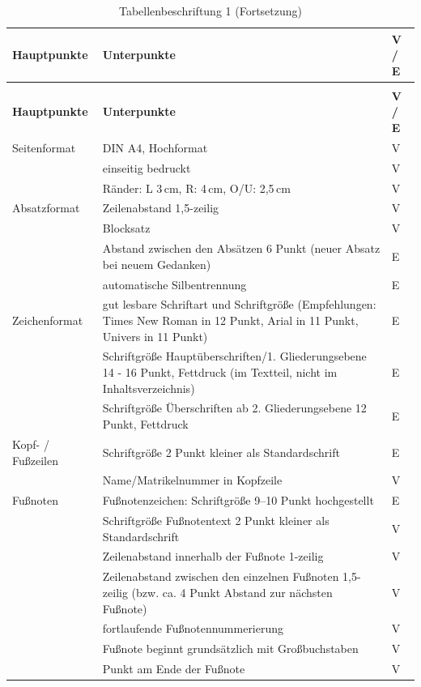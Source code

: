 \begingroup
\footnotesize
{}
\begin{longtable}{@{}p{}p{}
  >{\centering\arraybackslash}p{}@{}}
  \caption{Tabellenbeschriftung 1}
  \label{tab:hfh-format}\\
  \toprule
  \textbf{Hauptpunkte} &
  \textbf{Unterpunkte} &
  \textbf{V / E} \\
  \midrule
  \endfirsthead
  \caption[]{Tabellenbeschriftung 1 (Fortsetzung)}\\
  \toprule
  \textbf{Hauptpunkte} &
  \textbf{Unterpunkte} &
  \textbf{V / E} \\
  \midrule
  \endhead
  \bottomrule
  \endfoot

  Seitenformat &
  DIN A4, Hochformat &
  V \\
  &
  einseitig bedruckt &
  V \\
  &
  Ränder: L 3\,cm, R: 4\,cm, O/U: 2,5\,cm &
  V \\
  \midrule

  Absatzformat &
  Zeilenabstand 1,5-zeilig &
  V \\
  &
  Blocksatz &
  V \\
  &
  Abstand zwischen den Absätzen 6 Punkt
  (neuer Absatz bei neuem Gedanken) &
  E \\
  &
  automatische Silbentrennung &
  E \\
  \midrule

  Zeichenformat &
  gut lesbare Schriftart und Schriftgröße (Empfehlungen: Times New Roman in
  12 Punkt, Arial in 11 Punkt, Univers in 11 Punkt) &
  E \\
  &
  Schriftgröße Hauptüberschriften/1. Gliederungsebene 14 - 16 Punkt,
  Fettdruck (im Textteil, nicht im Inhaltsverzeichnis) &
  E \\
  &
  Schriftgröße Überschriften ab 2. Gliederungsebene 12 Punkt, Fettdruck &
  E \\
  \midrule

  Kopf- / Fußzeilen &
  Schriftgröße 2 Punkt kleiner als Standardschrift &
  E \\
  &
  Name/Matrikelnummer in Kopfzeile &
  V \\
  \midrule

  Fußnoten &
  Fußnotenzeichen: Schriftgröße 9--10 Punkt hochgestellt &
  E \\
  &
  Schriftgröße Fußnotentext 2 Punkt kleiner als Standardschrift &
  V \\
  &
  Zeilenabstand innerhalb der Fußnote 1-zeilig &
  V \\
  &
  Zeilenabstand zwischen den einzelnen Fußnoten 1,5-zeilig
  (bzw. ca. 4 Punkt Abstand zur nächsten Fußnote) &
  V \\
  &
  fortlaufende Fußnotennummerierung &
  V \\
  &
  Fußnote beginnt grundsätzlich mit Großbuchstaben &
  V \\
  &
  Punkt am Ende der Fußnote &
  V \\
  \midrule


\end{longtable}
